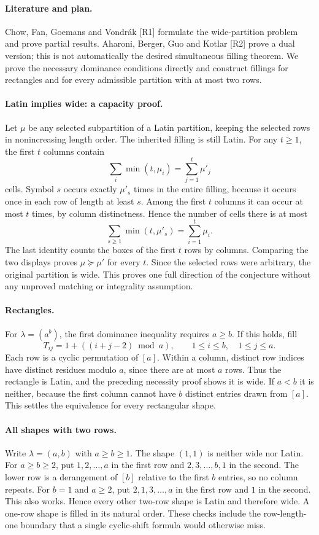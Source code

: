 \documentclass[11pt,a4paper]{article}
\begin{document}
\paragraph{Literature and plan.}
Chow, Fan, Goemans and Vondr\'ak [R1] formulate the wide-partition
problem and prove partial results. Aharoni, Berger, Guo and Kotlar
[R2] prove a dual version; this is not automatically the desired
simultaneous filling theorem. We prove the necessary dominance
conditions directly and construct fillings for rectangles and for
every admissible partition with at most two rows.

\paragraph{Latin implies wide: a capacity proof.}
Let $\mu$ be any selected subpartition of a Latin partition, keeping
the selected rows in nonincreasing length order. The inherited filling
is still Latin. For any $t\ge1$, the first $t$ columns contain
\[
 \sum_i\min(t,\mu_i)=\sum_{j=1}^t\mu'_j
\]
cells. Symbol $s$ occurs exactly $\mu'_s$ times in the entire filling,
because it occurs once in each row of length at least $s$. Among the
first $t$ columns it can occur at most $t$ times, by column
distinctness. Hence the number of cells there is at most
\[
 \sum_{s\ge1}\min(t,\mu'_s)=\sum_{i=1}^t\mu_i.
\]
The last identity counts the boxes of the first $t$ rows by columns.
Comparing the two displays proves $\mu\succeq\mu'$ for every $t$.
Since the selected rows were arbitrary, the original partition is wide.
This proves one full direction of the conjecture without any unproved
matching or integrality assumption.

\paragraph{Rectangles.}
For $\lambda=(a^b)$, the first dominance inequality requires
$a\ge b$. If this holds, fill
\[
 T_{ij}=1+((i+j-2)\bmod a),\qquad 1\le i\le b,\quad1\le j\le a.
\]
Each row is a cyclic permutation of $[a]$. Within a column, distinct
row indices have distinct residues modulo $a$, since there are at
most $a$ rows. Thus the rectangle is Latin, and the preceding
necessity proof shows it is wide. If $a<b$ it is neither, because
the first column cannot have $b$ distinct entries drawn from $[a]$.
This settles the equivalence for every rectangular shape.

\paragraph{All shapes with two rows.}
Write $\lambda=(a,b)$ with $a\ge b\ge1$. The shape $(1,1)$ is
neither wide nor Latin. For $a\ge b\ge2$, put $1,2,\ldots,a$ in
the first row and $2,3,\ldots,b,1$ in the second. The lower row is
a derangement of $[b]$ relative to the first $b$ entries, so no
column repeats. For $b=1$ and $a\ge2$, put
$2,1,3,\ldots,a$ in the first row and $1$ in the second. This
also works. Hence every other two-row shape is Latin and therefore
wide. A one-row shape is filled in its natural order. These checks
include the row-length-one boundary that a single cyclic-shift formula
would otherwise miss.
\end{document}
